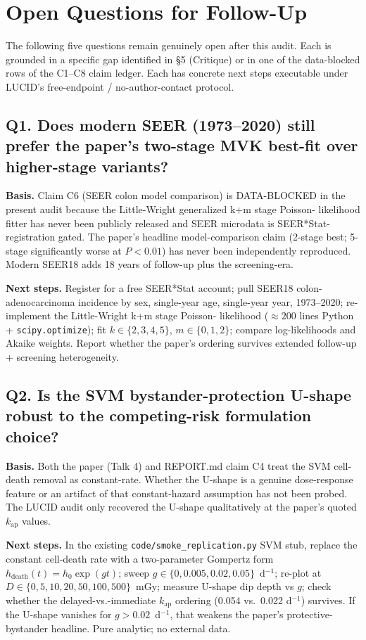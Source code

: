 \section{Open Questions for Follow-Up}

The following five questions remain genuinely open after this audit.
Each is grounded in a specific gap identified in \S5 (Critique) or in
one of the data-blocked rows of the C1--C8 claim ledger. Each has
concrete next steps executable under LUCID's free-endpoint /
no-author-contact protocol.

\subsection*{Q1. Does modern SEER (1973--2020) still prefer the paper's
two-stage MVK best-fit over higher-stage variants?}

\textbf{Basis.} Claim C6 (SEER colon model comparison) is DATA-BLOCKED in the
present audit because the Little-Wright generalized k+m stage Poisson-
likelihood fitter has never been publicly released and SEER microdata is
SEER*Stat-registration gated. The paper's headline model-comparison
claim (2-stage best; 5-stage significantly worse at $P<0.01$) has never
been independently reproduced. Modern SEER18 adds 18 years of follow-up
plus the screening-era.

\textbf{Next steps.} Register for a free SEER*Stat account; pull SEER18
colon-adenocarcinoma incidence by sex, single-year age, single-year
year, 1973--2020; re-implement the Little-Wright k+m stage Poisson-
likelihood ($\approx 200$ lines Python + \texttt{scipy.optimize});
fit $k\in\{2,3,4,5\}$, $m\in\{0,1,2\}$; compare log-likelihoods and
Akaike weights. Report whether the paper's ordering survives extended
follow-up + screening heterogeneity.

\subsection*{Q2. Is the SVM bystander-protection U-shape robust to the
competing-risk formulation choice?}

\textbf{Basis.} Both the paper (Talk 4) and REPORT.md claim C4 treat the
SVM cell-death removal as constant-rate. Whether the U-shape is a
genuine dose-response feature or an artifact of that constant-hazard
assumption has not been probed. The LUCID audit only recovered the
U-shape qualitatively at the paper's quoted $k_{\mathrm{ap}}$ values.

\textbf{Next steps.} In the existing \texttt{code/smoke\_replication.py}
SVM stub, replace the constant cell-death rate with a two-parameter
Gompertz form $h_{\text{death}}(t) = h_0 \exp(g t)$; sweep
$g\in\{0, 0.005, 0.02, 0.05\}$~d$^{-1}$; re-plot at
$D\in\{0,5,10,20,50,100,500\}$~mGy; measure U-shape dip depth vs $g$;
check whether the delayed-vs.-immediate $k_{\mathrm{ap}}$ ordering
(0.054 vs.\ 0.022 d$^{-1}$) survives. If the U-shape vanishes for
$g>0.02$~d$^{-1}$, that weakens the paper's protective-bystander
headline. Pure analytic; no external data.

